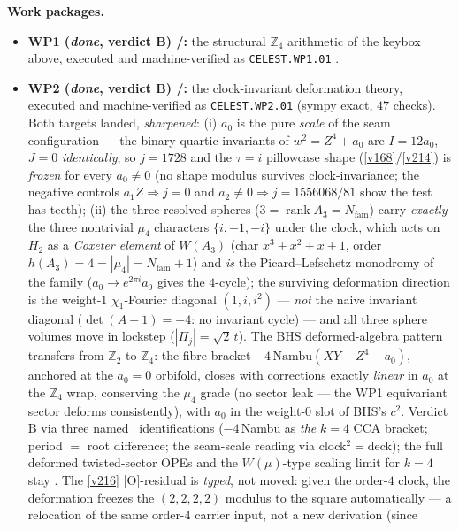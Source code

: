 \documentclass[11pt,a4paper]{article}
\newcommand{\Nfam}{N_{\mathrm{fam}}}
\newcommand{\Z}{\mathbb Z}
\begin{document}
\par\smallskip\noindent\textbf{Work packages.}
\begin{itemize}
\item \textbf{WP1 (\emph{done}, verdict B) \mE/\mC:} the structural $\Z_4$ arithmetic of the
keybox above, executed and machine-verified as \texttt{CELEST.WP1.01}
.
\item \textbf{WP2 (\emph{done}, verdict B) \mE/\mC:} the clock-invariant deformation theory, executed
and machine-verified as \texttt{CELEST.WP2.01} 
(sympy exact, $47$ checks). Both targets landed, \emph{sharpened}: (i) $a_0$ is the pure \emph{scale} of
the seam configuration --- the binary-quartic invariants of $w^2=Z^4{+}a_0$ are $I=12a_0$, $J=0$
\emph{identically}, so $j=1728$ and the $\tau{=}i$ pillowcase shape (\vref{v168}/\vref{v214}) is
\emph{frozen} for every $a_0\neq0$ (no shape modulus survives clock-invariance; the negative controls
$a_1Z\Rightarrow j{=}0$ and $a_2\neq0\Rightarrow j{=}1556068/81$ show the test has teeth); (ii) the three
resolved spheres ($3=\operatorname{rank}A_3=\Nfam$) carry \emph{exactly} the three nontrivial $\mu_4$
characters $\{i,-1,-i\}$ under the clock, which acts on $H_2$ as a \emph{Coxeter element} of $W(A_3)$
(char $x^3{+}x^2{+}x{+}1$, order $h(A_3){=}4{=}|\mu_4|{=}\Nfam{+}1$) and \emph{is} the Picard--Lefschetz
monodromy of the family ($a_0\to e^{2\pi i}a_0$ gives the $4$-cycle); the surviving deformation direction
is the weight-$1$ $\chi_1$-Fourier diagonal $(1,i,i^2)$ --- \emph{not} the naive invariant diagonal
($\det(A{-}1)={-}4$: no invariant cycle) --- and all three sphere volumes move in lockstep
($|\Pi_j|=\sqrt2\,t$). The BHS deformed-algebra pattern transfers from $\Z_2$ to $\Z_4$: the fibre bracket
$-4\,\mathrm{Nambu}(XY{-}Z^4{-}a_0)$, anchored at the $a_0{=}0$ orbifold, closes with corrections exactly
\emph{linear} in $a_0$ at the $\Z_4$ wrap, conserving the $\mu_4$ grade (no sector leak --- the WP1
equivariant sector deforms consistently), with $a_0$ in the weight-$0$ slot of BHS's $c^2$. Verdict B via
three named \mC\ identifications ($-4\,$Nambu as \emph{the} $k{=}4$ CCA bracket; period $=$ root
difference; the seam-scale reading via clock$^2=$deck); the full deformed twisted-sector OPEs and the
$W(\mu)$-type scaling limit for $k{=}4$ stay \mO. The \vref{v216} $[$O$]$-residual is \emph{typed}, not
moved: given the order-$4$ clock, the deformation freezes the $(2,2,2,2)$ modulus to the square
automatically --- a relocation of the same order-$4$ carrier input, not a new derivation (since

\end{itemize}
\end{document}
